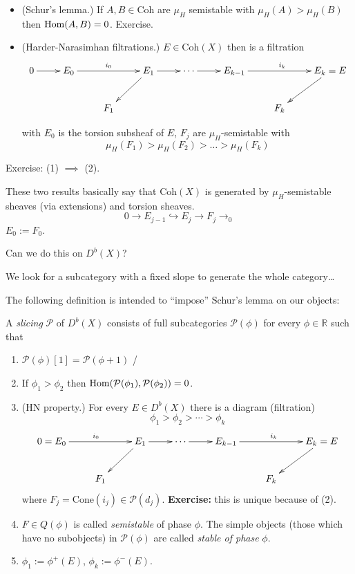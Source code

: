 \begin{itemize}
\item (Schur's lemma.) If $A,B \in \text{Coh}$ are $\mu_H$ semistable with
$\mu_H(A)>\mu_H(B)$ then $\mathop{\mathrm{Hom}}\nolimits(A,B)=0$. Exercise.
\item (Harder-Narasimhan filtrations.) $E \in \text{Coh}(X)$ then is a
filtration
$$
\xymatrix{
0\ar[r]&E_0\ar[rr]^{i_0}&&E_1\ar[dl]\ar[r]&\cdots\ar[r]
&E_{k-1}\ar[rr]^{i_k}&&E_k=E\ar[dl]\\
&&F_1& & & & F_k
}
$$
\iffalse$$
\xymatrix{
0\ar[r]&  E_0 \ar@{^{(}->}[r]&E_1\ar[d]\ar[r]&  \cdots \ar@{^{(}->}[r]&
E_k\ar[d]=E\\
& & F_1 & & F_k
}
$$\fi
with $E_0$ is the torsion subsheaf of $ E$, $F_j$ are $\mu_H$-semistable with
$$
\mu_H(F_1)>\mu_H(F_2)>\ldots>\mu_H(F_k)
$$
\end{itemize}

Exercise: (1) $\implies$ (2).

These two results basically say that $\text{Coh}(X)$ is generated by
$\mu_H$-semistable sheaves (via extensions) and torsion sheaves.
$$
0\to E_{j-1}\hookrightarrow E_j\to F_j\to_0
$$
$E_0:=F_0$.
 
Can we do this on $D^b(X)$?

We look for a subcategory with a fixed slope to generate the whole category…

\medskip

The following definition is intended to ``impose'' Schur's lemma on our objects:

\begin{definition}
\label{definition-slicing}

A {\it slicing} $\mathcal{P}$ of $D^b(X)$ consists of full subcategories
$\mathcal{P}(\phi)$ for every $\phi \in \mathbb{R}$ such that
\begin{enumerate}
\item $\mathcal{P}(\phi)[1]=\mathcal{P}(\phi+1)$ /
\item If $\phi_1>\phi_2$ then $\mathop{\mathrm{Hom}}\nolimits(\mathcal{P}(\phi_1),\mathcal{P}(\phi_2))=0$.
\item (HN property.) For every $E \in D^b(X)$ there is a diagram (filtration)
$$
\phi_1>\phi_2>\cdots>\phi_k
$$
$$
\xymatrix{
0=E_0\ar[rr]^{i_0}&&E_1\ar[dl]\ar[r]&\cdots\ar[r]
&E_{k-1}\ar[rr]^{i_k}&&E_k=E\ar[dl]\\
&F_1& & & & F_k
}
$$
where $F_j=\text{Cone}(i_j) \in \mathcal{P}(d_j)$. {\bf Exercise:} this is
unique because of (2).

\item  $F \in Q(\phi)$ is called {\it semistable} of phase $\phi$. The simple objects
(those which have no subobjects) in $\mathcal{P}(\phi)$ are called {\it stable
of phase} $\phi$.

\item  $\phi_1:=\phi^+(E)$, $\phi_k:=\phi^-(E)$.
\end{enumerate}
\end{definition}

